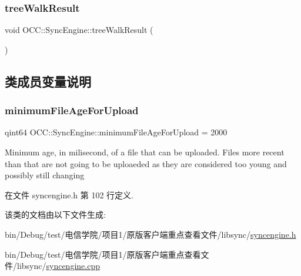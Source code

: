 \subsubsection{\texorpdfstring{tree\+Walk\+Result}{treeWalkResult}}
{\footnotesize\ttfamily void O\+C\+C\+::\+Sync\+Engine\+::tree\+Walk\+Result (\begin{DoxyParamCaption}\item[{const \hyperlink{namespace_o_c_c_af407f0fdf0476e0bfce478be3d0e441e}{Sync\+File\+Item\+Vector} \&}]{ }\end{DoxyParamCaption})\hspace{0.3cm}{\ttfamily [signal]}}



\subsection{类成员变量说明}
\mbox{\label{class_o_c_c_1_1_sync_engine_a2cf8c1163d96451a9f48fc0b75f37728}} 
\subsubsection{\texorpdfstring{minimum\+File\+Age\+For\+Upload}{minimumFileAgeForUpload}}
{\footnotesize\ttfamily qint64 O\+C\+C\+::\+Sync\+Engine\+::minimum\+File\+Age\+For\+Upload = 2000\hspace{0.3cm}{\ttfamily [static]}}

Minimum age, in milisecond, of a file that can be uploaded. Files more recent than that are not going to be uploaeded as they are considered too young and possibly still changing 

在文件 syncengine.\+h 第 102 行定义.



该类的文档由以下文件生成\+:\begin{DoxyCompactItemize}
\item 
bin/\+Debug/test/电信学院/项目1/原版客户端重点查看文件/libsync/\hyperlink{syncengine_8h}{syncengine.\+h}\item 
bin/\+Debug/test/电信学院/项目1/原版客户端重点查看文件/libsync/\hyperlink{syncengine_8cpp}{syncengine.\+cpp}\end{DoxyCompactItemize}
